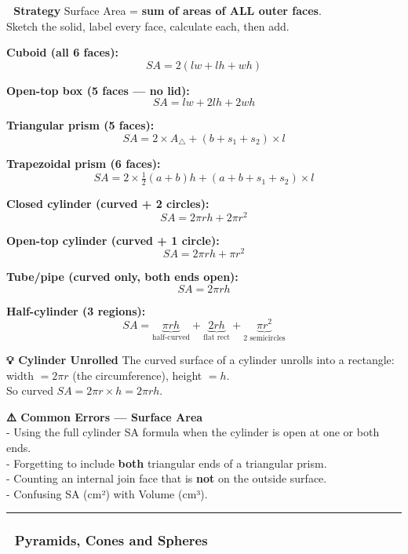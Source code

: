 \documentclass[
  letterpaper,
  DIV=11,
  numbers=noendperiod]{scrreprt}
\theoremstyle{definition}
\theoremstyle{remark}
\begin{document}
\textbf{📝 Strategy} Surface Area = \textbf{sum of areas of ALL outer
faces}.\\
Sketch the solid, label every face, calculate each, then add.

\textbf{Cuboid (all 6 faces):} \[SA = 2(lw + lh + wh)\]

\textbf{Open-top box (5 faces --- no lid):} \[SA = lw + 2lh + 2wh\]

\textbf{Triangular prism (5 faces):}
\[SA = 2 \times A_{\triangle} + (b + s_1 + s_2) \times l\]

\textbf{Trapezoidal prism (6 faces):}
\[SA = 2 \times \tfrac{1}{2}(a+b)h + (a + b + s_1 + s_2) \times l\]

\textbf{Closed cylinder (curved + 2 circles):}
\[SA = 2\pi rh + 2\pi r^2\]

\textbf{Open-top cylinder (curved + 1 circle):}
\[SA = 2\pi rh + \pi r^2\]

\textbf{Tube/pipe (curved only, both ends open):} \[SA = 2\pi rh\]

\textbf{Half-cylinder (3 regions):}
\[SA = \underbrace{\pi r h}_{\text{half-curved}} + \underbrace{2rh}_{\text{flat rect}} + \underbrace{\pi r^2}_{\text{2 semicircles}}\]

\textbf{💡 Cylinder Unrolled} The curved surface of a cylinder unrolls
into a rectangle:\\
width \(= 2\pi r\) (the circumference), height \(= h\).\\
So curved \(SA = 2\pi r \times h = 2\pi rh\).

\textbf{⚠️ Common Errors --- Surface Area}\\
- Using the full cylinder SA formula when the cylinder is open at one or
both ends.\\
- Forgetting to include \textbf{both} triangular ends of a triangular
prism.\\
- Counting an internal join face that is \textbf{not} on the outside
surface.\\
- Confusing SA (cm²) with Volume (cm³).

\begin{center}\rule{0.5\linewidth}{0.5pt}\end{center}

\subsubsection*{🔺 Pyramids, Cones and
Spheres}\label{pyramids-cones-and-spheres}
\end{document}
